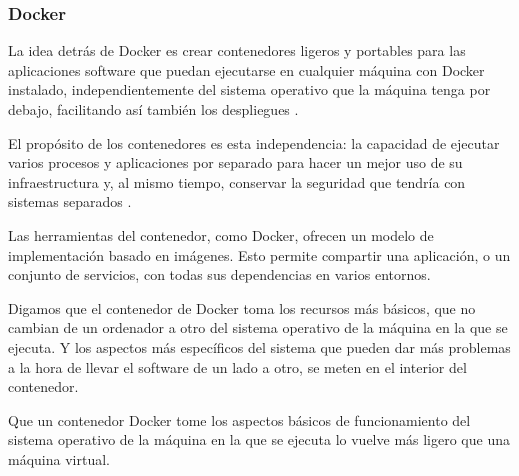\subsubsection{Docker}

La idea detrás de Docker es crear contenedores ligeros y portables para las aplicaciones software que puedan ejecutarse en cualquier máquina con Docker instalado, independientemente del sistema operativo que la máquina tenga por debajo, facilitando así también los despliegues \cite{docker4}.

El propósito de los contenedores es esta independencia: la capacidad de ejecutar varios procesos y aplicaciones por separado para hacer un mejor uso de su infraestructura y, al mismo tiempo, conservar la seguridad que tendría con sistemas separados \cite{docker5}.

Las herramientas del contenedor, como Docker, ofrecen un modelo de implementación basado en imágenes. Esto permite compartir una aplicación, o un conjunto de servicios, con todas sus dependencias en varios entornos.

Digamos que el contenedor de Docker toma los recursos más básicos, que no cambian de un ordenador a otro del sistema operativo de la máquina en la que se ejecuta. Y los aspectos más específicos del sistema que pueden dar más problemas a la hora de llevar el software de un lado a otro, se meten en el interior del contenedor.

Que un contenedor Docker tome los aspectos básicos de funcionamiento del sistema operativo de la máquina en la que se ejecuta lo vuelve más ligero que una máquina virtual.
